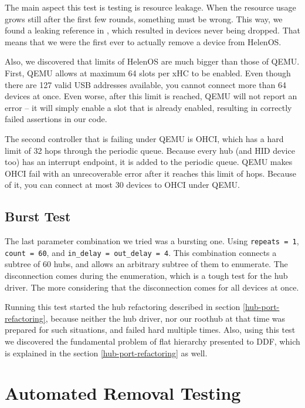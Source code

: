 The main aspect this test is testing is resource leakage. When the resource
usage grows still after the first few rounds, something must be wrong. This
way, we found a leaking reference in , which resulted in devices
never being dropped. That means that we were the first ever to actually remove
a device from HelenOS.

Also, we discovered that limits of HelenOS are much bigger than those of QEMU.
First, QEMU allows at maximum 64 slots per xHC to be enabled. Even though there
are 127 valid USB addresses available, you cannot connect more than 64 devices
at once. Even worse, after this limit is reached, QEMU will not report an error
-- it will simply enable a slot that is already enabled, resulting in correctly
failed assertions in our code.

The second controller that is failing under QEMU is OHCI, which has a hard
limit of 32 hops through the periodic queue. Because every hub (and HID device
too) has an interrupt endpoint, it is added to the periodic queue. QEMU makes
OHCI fail with an unrecoverable error after it reaches this limit of hops.
Because of it, you can connect at most 30 devices to OHCI under QEMU.

\subsection{Burst Test}

The last parameter combination we tried was a bursting one. Using
\texttt{repeats = 1}, \texttt{count = 60}, and \texttt{in\_delay = out\_delay
= 4}. This combination connects a subtree of 60 hubs, and allows an arbitrary
subtree of them to enumerate. The disconnection comes during the enumeration,
which is a tough test for the hub driver. The more considering that the
disconnection comes for all devices at once.

Running this test started the hub refactoring described in section
\ref{hub-port-refactoring}, because neither the hub driver, nor our roothub at
that time was prepared for such situations, and failed hard multiple times.
Also, using this test we discovered the fundamental problem of flat hierarchy
presented to DDF, which is explained in the section \ref{hub-port-refactoring}
as well.

\section{Automated Removal Testing}
\label{sec:removal-testing}

